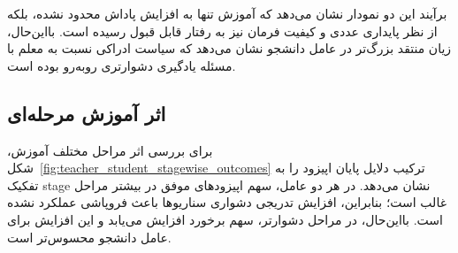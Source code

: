 برآیند این دو نمودار نشان می‌دهد که آموزش تنها به افزایش پاداش محدود نشده، بلکه از نظر پایداری عددی و کیفیت فرمان نیز به رفتار قابل قبول رسیده است. بااین‌حال، زیان منتقد بزرگ‌تر در عامل دانشجو نشان می‌دهد که سیاست ادراکی نسبت به معلم با مسئله یادگیری دشوارتری روبه‌رو بوده است.

\subsection{اثر آموزش مرحله‌ای}
\label{subsec:curriculum_effect_analysis}

برای بررسی اثر مراحل مختلف آموزش، شکل~\ref{fig:teacher_student_stagewise_outcomes} ترکیب دلایل پایان اپیزود را به تفکیک stage نشان می‌دهد. در هر دو عامل، سهم اپیزودهای موفق در بیشتر مراحل غالب است؛ بنابراین، افزایش تدریجی دشواری سناریوها باعث فروپاشی عملکرد نشده است. بااین‌حال، در مراحل دشوارتر، سهم برخورد افزایش می‌یابد و این افزایش برای عامل دانشجو محسوس‌تر است.

